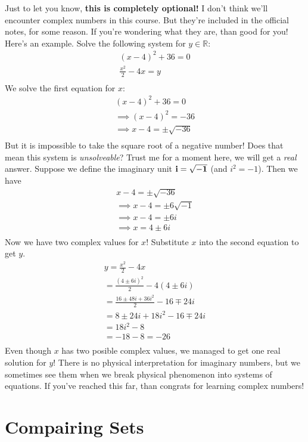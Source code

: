 \myremark
{
	Just to let you know, {\bf this is completely optional!} I don't think we'll encounter complex numbers in this course. But they're included in the official notes, for some reason. If you're wondering what they are, than good for you! Here's an example. Solve the following system for $y \in \mathbb{R}$:
	\begin{align*}
		(x-4)^2+36=0\\
		\frac{x^2}{2}-4x=y\\
	\end{align*}
	We solve the first equation for $x$:
	\begin{align*}
		(x-4)^2+36=0\\
		\implies (x-4)^2=-36\\
		\implies x-4=\pm\sqrt{-36}\\
	\end{align*}
	But it is impossible to take the square root of a negative number! Does that mean this system is \emph{unsolveable}? Trust me for a moment here, we will get a \emph{real} answer. Suppose we define the imaginary unit $\bf{i} = \sqrt{-1}$ (and $i^2=-1$). Then we have
	\begin{align*}
		x-4=\pm\sqrt{-36}\\
		\implies x-4=\pm6\sqrt{-1}\\
		\implies x-4=\pm6i\\
		\implies x=4\pm6i\\
	\end{align*}
	Now we have two complex values for $x$! Substitute $x$ into the second equation to get $y$.
	\begin{align*}
		y=\frac{x^2}{2}-4x\\
		=\frac{(4\pm6i)^2}{2}-4(4\pm6i)\\
		=\frac{16\pm48i+36i^2}{2}-16\mp24i\\
		=8\pm24i+18i^2-16\mp24i\\
		=18i^2-8\\
		=-18-8=-26\\
	\end{align*}
	Even though $x$ has two posible complex values, we managed to get one real solution for $y$! There is no physical interpretation for imaginary numbers, but we sometimes see them when we break physical phenomenon into systems of equations. If you've reached this far, than congrats for learning complex numbers!
}

\section{Compairing Sets}


